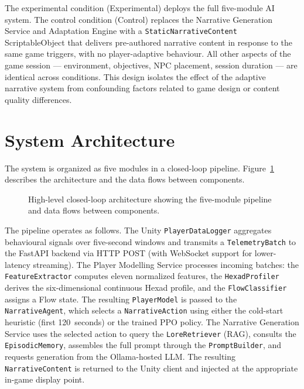 \documentclass[12pt,a4paper]{report}
\begin{document}
The experimental condition (Experimental) deploys the full five-module AI system. The control condition (Control) replaces the Narrative Generation Service and Adaptation Engine with a \texttt{StaticNarrativeContent} ScriptableObject that delivers pre-authored narrative content in response to the same game triggers, with no player-adaptive behaviour. All other aspects of the game session --- environment, objectives, NPC placement, session duration --- are identical across conditions. This design isolates the effect of the adaptive narrative system from confounding factors related to game design or content quality differences.

\section{System Architecture}

The system is organized as five modules in a closed-loop pipeline. Figure~\ref{fig:architecture} describes the architecture and the data flows between components.

\begin{figure}[H]
\centering
{}
\caption{High-level closed-loop architecture showing the five-module pipeline and data flows between components.}
\label{fig:architecture}
\end{figure}

The pipeline operates as follows. The Unity \texttt{PlayerDataLogger} aggregates behavioural signals over five-second windows and transmits a \texttt{TelemetryBatch} to the FastAPI backend via HTTP POST (with WebSocket support for lower-latency streaming). The Player Modelling Service processes incoming batches: the \texttt{FeatureExtractor} computes eleven normalized features, the \texttt{HexadProfiler} derives the six-dimensional continuous Hexad profile, and the \texttt{FlowClassifier} assigns a Flow state. The resulting \texttt{PlayerModel} is passed to the \texttt{NarrativeAgent}, which selects a \texttt{NarrativeAction} using either the cold-start heuristic (first 120~seconds) or the trained PPO policy. The Narrative Generation Service uses the selected action to query the \texttt{LoreRetriever} (RAG), consults the \texttt{EpisodicMemory}, assembles the full prompt through the \texttt{PromptBuilder}, and requests generation from the Ollama-hosted LLM. The resulting \texttt{NarrativeContent} is returned to the Unity client and injected at the appropriate in-game display point.
\end{document}
